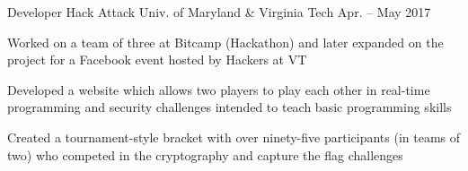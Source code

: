

\begin{cventries}

  \cventry
    {Developer} %
    {Hack Attack} %
    {Univ. of Maryland \& Virginia Tech} %
    {Apr. – May 2017} %
    {
      \begin{cvitems} %
      \item {Worked on a team of three at Bitcamp (Hackathon) and later expanded on the project for a Facebook event hosted by Hackers at VT}
      \item {Developed a website which allows two players to play each other in real-time programming and security challenges intended to teach basic programming skills}
      \item {Created a tournament-style bracket with over ninety-five participants (in teams of two) who competed in the cryptography and capture the flag challenges}
      \end{cvitems}
    }

\end{cventries}
